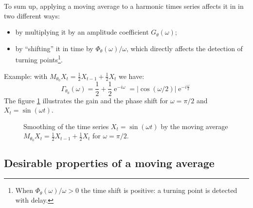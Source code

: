 \documentclass[
  12pt,
  ,
  a4paper]{article}
\DeclareMathOperator{\e}{e}
\newcommand\1{\mathds{1}}
\begin{document}
To sum up, applying a moving average to a harmonic times series affects it in in two different ways:

\begin{itemize}
\item
  by multiplying it by an amplitude coefficient \(G_{\theta}\left(\omega\right)\);
\item
  by ``shifting'' it in time by \(\Phi_\theta(\omega)/\omega\), which directly affects the detection of turning points\footnote{When \(\Phi_\theta(\omega)/\omega>0\) the time shift is positive: a turning point is detected with delay.}.
\end{itemize}

Example: with \(M_{\theta_0}X_t=\frac{1}{2}X_{t-1}+\frac{1}{2}X_{t}\) we have:
\[
\Gamma_{\theta_0}(\omega)=\frac{1}{2}+\frac{1}{2}\e^{-i\omega}
=\lvert\cos(\omega/2)\rvert\e^{-i\frac{\omega}{2}}
\]
The figure \ref{fig:exgainPhase} illustrates the gain and the phase shift for \(\omega=\pi/2\) and \(X_t=\sin(\omega t)\).

\begin{figure}[!ht]
\caption{Smoothing of the time series $X_t=\sin(\omega t)$ by the moving average $M_{\theta_0}X_t=\frac{1}{2}X_{t-1}+\frac{1}{2}X_{t}$ for $\omega=\pi/2$.}\label{fig:exgainPhase}
\end{figure}

\hypertarget{desirable-properties-of-a-moving-average}{%
\subsection{Desirable properties of a moving average}\label{desirable-properties-of-a-moving-average}}
\end{document}
